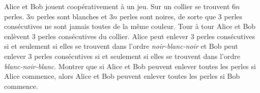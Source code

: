 Alice et Bob jouent coopérativement à un jeu. Sur un collier se trouvent $6n$ perles. $3n$ perles sont blanches et $3n$ perles sont noires, de sorte que $3$ perles consécutives ne sont jamais toutes de la même couleur. Tour à tour Alice et Bob enlèvent $3$ perles consécutives du collier. Alice peut enlever $3$ perles consécutives si et seulement si elles se trouvent dans l'ordre \textit{noir-blanc-noir} et Bob peut enlever $3$ perles consécutives si et seulement si elles se trouvent dans l'ordre \textit{blanc-noir-blanc}. Montrer que si Alice et Bob peuvent enlever toutes les perles si Alice commence, alors Alice et Bob peuvent enlever toutes les perles si Bob commence.